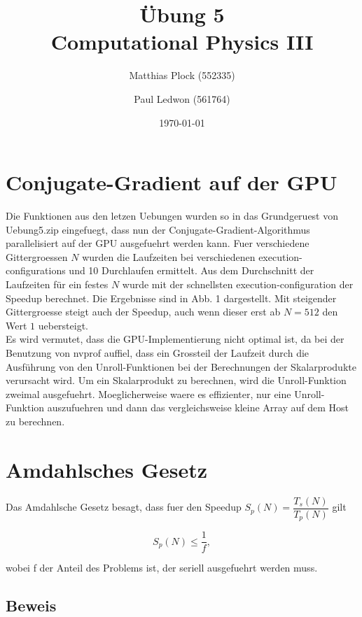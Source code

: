 \documentclass[10pt,a4paper]{article}
\title{Übung 5 \\Computational Physics III}
\author{Matthias Plock (552335) \and Paul Ledwon (561764)} %
\date{\today}
\begin{document}
\maketitle
\tableofcontents

\pagestyle{myheadings}                  %

\section{Conjugate-Gradient auf der GPU}

Die Funktionen aus den letzen Uebungen wurden so in das Grundgeruest von Uebung5.zip 
eingefuegt, dass nun der Conjugate-Gradient-Algorithmus parallelisiert auf der GPU
ausgefuehrt werden kann. Fuer verschiedene Gittergroessen $N$ wurden die Laufzeiten 
bei verschiedenen execution-configurations und 10 Durchlaufen ermittelt. Aus dem 
Durchschnitt der Laufzeiten für ein festes $N$ wurde mit der schnellsten execution-configuration
der Speedup berechnet. Die Ergebnisse sind in Abb. 1 dargestellt. Mit steigender Gittergroesse 
steigt auch der Speedup, auch wenn dieser erst ab $N=512$ den Wert $1$ uebersteigt.\\

Es wird vermutet, dass die GPU-Implementierung nicht optimal ist, da bei der Benutzung von nvprof
auffiel, dass ein Grossteil der Laufzeit durch die Ausführung von den Unroll-Funktionen bei der Berechnungen
der Skalarprodukte verursacht wird. Um ein Skalarprodukt zu berechnen, wird die Unroll-Funktion zweimal ausgefuehrt. Moeglicherweise
waere es effizienter, nur eine Unroll-Funktion auszufuehren und dann das vergleichsweise kleine Array auf dem Host zu berechnen. 




\section{Amdahlsches Gesetz}

Das Amdahlsche Gesetz besagt, dass fuer den Speedup $S_p(N) = \dfrac{T_s(N)}{T_p(N)}$
gilt

\begin{equation}
	S_p(N) \leq \frac{1}{f},
\end{equation}

wobei f der Anteil des Problems ist, der seriell ausgefuehrt werden muss.

\subsection{Beweis}
\end{document}
